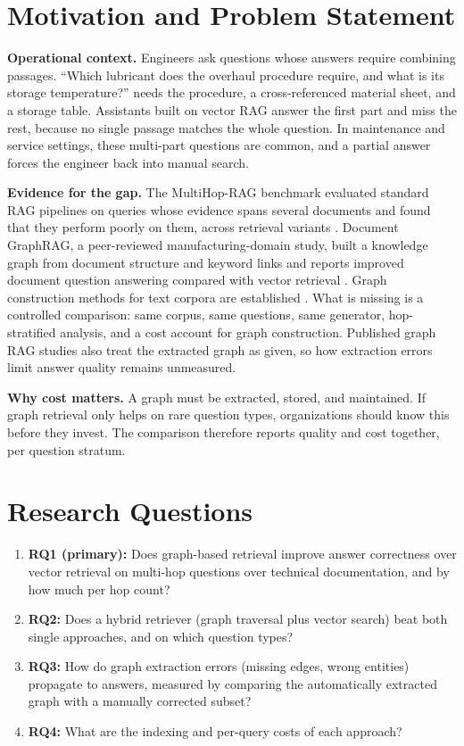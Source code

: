 \documentclass[10pt,a4paper]{article}
\begin{document}
\section{Motivation and Problem Statement}

\textbf{Operational context.} Engineers ask questions whose answers require combining passages. ``Which lubricant does the overhaul procedure require, and what is its storage temperature?'' needs the procedure, a cross-referenced material sheet, and a storage table. Assistants built on vector RAG answer the first part and miss the rest, because no single passage matches the whole question. In maintenance and service settings, these multi-part questions are common, and a partial answer forces the engineer back into manual search.

\textbf{Evidence for the gap.} The MultiHop-RAG benchmark evaluated standard RAG pipelines on queries whose evidence spans several documents and found that they perform poorly on them, across retrieval variants \cite{tang2024}. Document GraphRAG, a peer-reviewed manufacturing-domain study, built a knowledge graph from document structure and keyword links and reports improved document question answering compared with vector retrieval \cite{documentgraphrag2025}. Graph construction methods for text corpora are established \cite{edge2024graphrag}. What is missing is a controlled comparison: same corpus, same questions, same generator, hop-stratified analysis, and a cost account for graph construction. Published graph RAG studies also treat the extracted graph as given, so how extraction errors limit answer quality remains unmeasured.

\textbf{Why cost matters.} A graph must be extracted, stored, and maintained. If graph retrieval only helps on rare question types, organizations should know this before they invest. The comparison therefore reports quality and cost together, per question stratum.

\section{Research Questions}

\begin{enumerate}
    \item \textbf{RQ1 (primary):} Does graph-based retrieval improve answer correctness over vector retrieval on multi-hop questions over technical documentation, and by how much per hop count?
    \item \textbf{RQ2:} Does a hybrid retriever (graph traversal plus vector search) beat both single approaches, and on which question types?
    \item \textbf{RQ3:} How do graph extraction errors (missing edges, wrong entities) propagate to answers, measured by comparing the automatically extracted graph with a manually corrected subset?
    \item \textbf{RQ4:} What are the indexing and per-query costs of each approach?
\end{enumerate}
\end{document}
